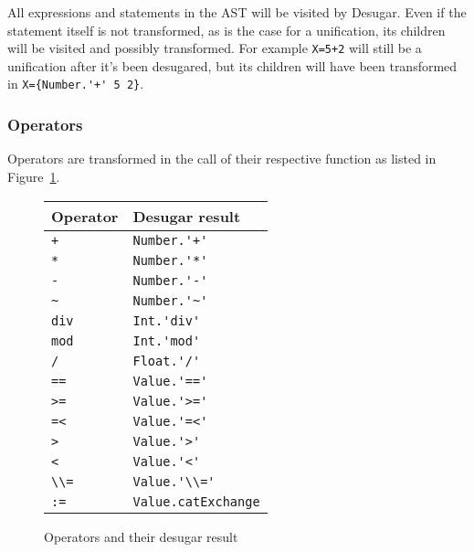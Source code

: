 \documentclass[a4paper]{memoir}
\begin{document}
All expressions and statements in the AST will be visited by Desugar. Even if the statement itself is not transformed, as is the case for a unification, its children will be visited and possibly transformed. For example
\lstinline!X=5+2! will still be a unification after it's been desugared, but its
children will have been transformed in \lstinline!X={Number.'+' 5 2}!.



\subsubsection{Operators}
Operators are transformed in the call of their respective function as listed in Figure~\ref{table:operators}.

\begin{figure}[h]
\begin{center}
\begin{tabular}{| l l |}
  \hline
  Operator & Desugar result \\
  \hline
  \lstinline!+! & \lstinline!Number.'+'! \\
  \lstinline!*! & \lstinline!Number.'*'! \\
  \lstinline!-! & \lstinline!Number.'-'! \\
  \lstinline!~! & \lstinline!Number.'~'! \\
  \lstinline!div! & \lstinline!Int.'div'! \\
  \lstinline!mod! & \lstinline!Int.'mod'! \\
  \lstinline!/! & \lstinline!Float.'/'! \\
  \lstinline!==! & \lstinline!Value.'=='! \\
  \lstinline!>=! & \lstinline!Value.'>='! \\
  \lstinline!=<! & \lstinline!Value.'=<'! \\
  \lstinline!>! & \lstinline!Value.'>'! \\
  \lstinline!<! & \lstinline!Value.'<'! \\
  \lstinline!\\=! & \lstinline!Value.'\\='! \\
  \lstinline!:=! & \lstinline!Value.catExchange! \\
  \hline
\end{tabular}
\end{center}
\caption{Operators and their desugar result}
\label{table:operators}
\end{figure}
\end{document}
